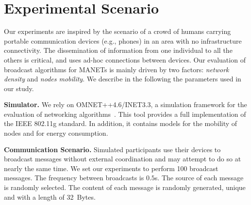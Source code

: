 \newcommand{\nodesNumber}{500}
\newcommand{\densitiesNumber}{8}
\newcommand{\nrMessages}{100}

\section{Experimental Scenario}
\label{sec:scenarios}

Our experiments are inspired by the scenario of a crowd of humans carrying portable communication devices (e.g., phones) in an area with no infrastructure connectivity.
The dissemination of information from one individual to all the others is critical, and uses ad-hoc connections between devices.
%
Our evaluation of broadcast algorithms for MANETs is mainly driven by two factors: \emph{network density} and \emph{nodes mobility}.
%
We describe in the following the parameters used in our study.

\smallskip
\noindent
\textbf{Simulator.}
We rely on OMNET++4.6/INET3.3, a simulation framework for the evaluation of networking algorithms~\cite{Varga:2008:OOS:1416222.1416290}.
%
This tool provides a full implementation of the IEEE 802.11g standard.
%
In addition, it contains models for the mobility of nodes and for energy consumption.

\smallskip
\noindent
\textbf{Communication Scenario.}
Simulated participants use their devices to broadcast messages without external coordination and may attempt to do so at nearly the same time.
%
We set our experiments to perform \nrMessages{} broadcast messages.
The frequency between broadcasts is $0.5$s.
%
The source of each message is randomly selected.
%
The content of each message is randomly generated, unique and with a length of 32~Bytes. 
%
%

